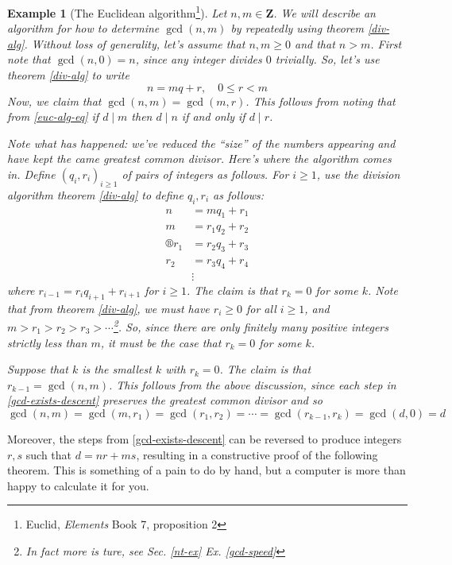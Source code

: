 \documentclass[12pt]{article}
\numberwithin{equation}{subsection}
\theoremstyle{note}
\newtheorem{example}[subsection]{Example}
\begin{document}
\begin{example}[The Euclidean algorithm\footnote{Euclid, \textit{Elements} Book 7, proposition 2}] \label{Euc-alg}
	Let $n,m\in \mathbf{Z}$. We will describe an algorithm for how to determine $\gcd(n,m)$ by repeatedly using theorem \ref{div-alg}. Without loss of generality, let's assume that $n,m\geq 0$ and that $n>m$. First note that $\gcd(n,0)=n$, since any integer divides $0$ trivially. So, let's use theorem \ref{div-alg} to write \begin{equation} \label{euc-alg-eq} n=mq+r, \quad 0\leq r<m \end{equation} Now, we claim that $\gcd(n,m)=\gcd(m,r)$. This follows from noting that from \eqref{euc-alg-eq} if $d\mid m$ then $d\mid n$ if and only if $d\mid r$. 
	
	Note what has happened: we've reduced the ``size'' of the numbers appearing and have kept the came greatest common divisor. Here's where the algorithm comes in. Define $(q_i,r_i)_{i\geq 1}$ of pairs of integers as follows. For $i\geq 1$, use the division algorithm theorem \ref{div-alg} to define $q_i,r_i$ as follows: \begin{align}\label{gcd-exists-descent} 
		n&=mq_1+r_1 \nonumber \\
		m&=r_1 q_2+r_2 \nonumber \\®
		r_1&= r_2 q_3+r_3 \nonumber \\
		r_2& = r_3q_4 + r_4  \\
		&\vdots \nonumber
	\end{align}
	where $r_{i-1}=r_{i}q_{i+1}+r_{i+1}$ for $i\geq 1$. The claim is that $r_k=0$ for some $k$. Note that from theorem \ref{div-alg}, we must have $r_i\geq 0$ for all $i\geq 1$, and $m> r_1>r_2>r_3>\cdots$\footnote{In fact more is ture, see Sec. \ref{nt-ex} Ex. \ref{gcd-speed} }. So, since there are only finitely many positive integers strictly less than $m$, it must be the case that $r_k=0$ for some $k$. 
	
	Suppose that $k$ is the smallest $k$ with $r_k=0$. The claim is that $r_{k-1}=\gcd(n,m)$. This follows from the above discussion, since each step in \eqref{gcd-exists-descent} preserves the greatest common divisor and so \[ \gcd(n,m)=\gcd(m,r_1)=\gcd(r_1,r_2)=\cdots = \gcd(r_{k-1},r_k)=\gcd(d,0)=d\] 
\end{example}

Moreover, the steps from \eqref{gcd-exists-descent} can be reversed to produce integers $r,s$ such that $d=nr+ms$, resulting in a constructive proof of the following theorem. This is something of a pain to do by hand, but a computer is more than happy to calculate it for you.
\end{document}
